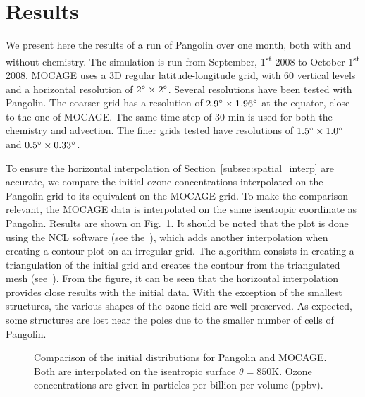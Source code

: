 \section{Results}
\label{sec:results_final}
We present here the results of a run of Pangolin over one month, both with and
without chemistry. The simulation is run from September, 1\textsuperscript{st}
2008 to October 1\textsuperscript{st} 2008. MOCAGE uses a 3D regular
latitude-longitude grid, with 60 vertical levels and a horizontal resolution of
$2^{\circ}\times2^{\circ}$. Several resolutions have been tested with Pangolin. The
coarser grid has a resolution of $2.9^{\circ} \times1.96^{\circ}$ at the equator,
close to the one of MOCAGE\@. The same time-step of 30 min is used for both the
chemistry and advection. The finer grids tested have resolutions of $1.5^{\circ}
\times1.0^{\circ}$ and $0.5^{\circ} \times0.33^{\circ}$.

To ensure the horizontal interpolation of Section~\ref{subsec:spatial_interp}
are accurate, we compare the initial ozone concentrations interpolated on the
Pangolin grid to its equivalent on the MOCAGE grid. To make the comparison
relevant, the MOCAGE data is interpolated on the same isentropic coordinate as
Pangolin. Results are shown on Fig.~\ref{fig:31lat_0}. It should be noted that
the plot is done using the NCL software (see the~), which adds
another interpolation when creating a contour plot on an irregular grid. The
algorithm consists in creating a triangulation of the initial grid and creates
the contour from the triangulated mesh (see~). From
the figure, it can be seen that the horizontal interpolation provides close
results with the initial data. With the exception of the smallest structures,
the various shapes of the ozone field are well-preserved.  As expected, some
structures are lost near the poles due to the smaller number of cells of
Pangolin.
\begin{figure}
  \hfill
  \caption{Comparison of the initial distributions for Pangolin and MOCAGE\@. Both
  are interpolated on the isentropic surface $\theta=850$K.  Ozone
  concentrations are given in particles per  billion per volume (ppbv).}
\label{fig:31lat_0}
\end{figure}

